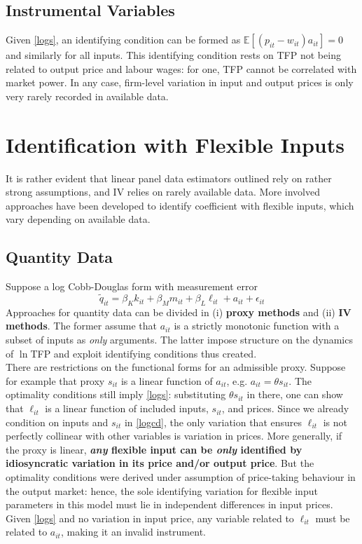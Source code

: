 \documentclass[11pt]{article}
\begin{document}
\subsection{Instrumental Variables}
Given \eqref{logs}, an identifying condition can be formed as $\mathbb{E}[(p_{it} - w_{it})a_{it}] = 0$ and similarly for all inputs.
This identifying condition rests on TFP not being related to output price and labour wages: for one, TFP cannot be correlated with market power.
In any case, firm-level variation in input and output prices is only very rarely recorded in available data.

\section{Identification with Flexible Inputs}

It is rather evident that linear panel data estimators outlined rely on rather strong assumptions, and IV relies on rarely available data.
More involved approaches have been developed to identify coefficient with flexible inputs, which vary depending on available data.

\subsection{Quantity Data}

Suppose a log Cobb-Douglas form with measurement error
\begin{equation}
	\label{logcd}
	\tilde{q}_{it} = \beta_K k_{it} + \beta_M m_{it} + \beta_L \ell_{it} + a_{it} + \epsilon_{it}
\end{equation}
Approaches for quantity data can be divided in (i) \textbf{proxy methods} and (ii) \textbf{IV methods}.
The former assume that $a_{it}$ is a strictly monotonic function with a subset of inputs as \textit{only} arguments.
The latter impose structure on the dynamics of $\ln$TFP and exploit identifying conditions thus created. \\

There are restrictions on the functional forms for an admissible proxy.
Suppose for example that proxy $s_{it}$ is a linear function of $a_{it}$, e.g. $a_{it} = \theta s_{it}$.
The optimality conditions still imply \eqref{logs}: substituting $\theta s_{it}$ in there, one can show that $\ell_{it}$ is a linear function of included inputs, $s_{it}$, and prices.
Since we already condition on inputs and $s_{it}$ in \eqref{logcd}, the only variation that ensures $\ell_{it}$ is not perfectly collinear with other variables is variation in prices.
More generally, if the proxy is linear, \textbf{\textit{any} flexible input can be \textit{only} identified by idiosyncratic variation in its price and/or output price}.
But the optimality conditions were derived under assumption of price-taking behaviour in the output market: hence, the sole identifying variation for flexible input parameters in this model must lie in independent differences in input prices.
Given \eqref{logs} and no variation in input price, any variable related to $\ell_{it}$ must be related to $a_{it}$, making it an invalid instrument. \\
\end{document}
